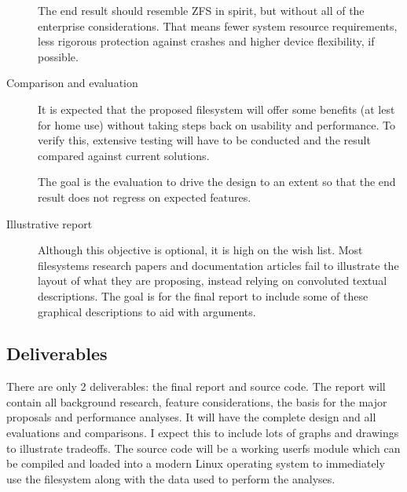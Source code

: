 \begin{description}
            The end result should resemble ZFS in spirit, but without all of
            the enterprise considerations. That means fewer system resource
            requirements, less rigorous protection against crashes and higher
            device flexibility, if possible.

        \item[Comparison and evaluation]

            It is expected that the proposed filesystem will offer some
            benefits (at lest for home use) without taking steps back on
            usability and performance. To verify this, extensive testing will
            have to be conducted and the result compared against current
            solutions.

            The goal is the evaluation to drive the design to an extent so that
            the end result does not regress on expected features.

        \item[Illustrative report]

            Although this objective is optional, it is high on the wish list.
            Most filesystems research papers and documentation articles fail to
            illustrate the layout of what they are proposing, instead relying
            on convoluted textual descriptions. The goal is for the final
            report to include some of these graphical descriptions to aid with
            arguments.

    \end{description}


\subsection{Deliverables}

    There are only 2 deliverables: the final report and source code. The report
    will contain all background research, feature considerations, the basis for
    the major proposals and performance analyses. It will have the complete
    design and all evaluations and comparisons. I expect this to include lots
    of graphs and drawings to illustrate tradeoffs. The source code will be a
    working userfs module which can be compiled and loaded into a modern Linux
    operating system to immediately use the filesystem along with the data used
    to perform the analyses.

